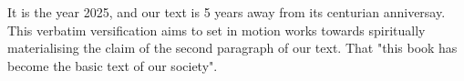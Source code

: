 \begin{fmatterchapter}
It is the year 2025, and our text is 5 years away 
    from its centurian anniversay.
This verbatim versification aims to set in motion works towards 
    spiritually materialising the claim 
    of the second paragraph of our text.
That "this book has become the basic text of our society".





\end{fmatterchapter}
